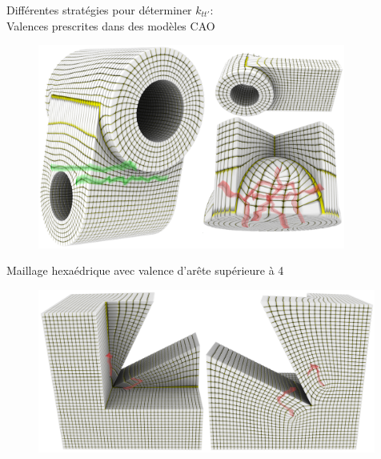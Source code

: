 \begin{frame}{Différentes stratégies pour déterminer $k_{tt'}$:\\Valences prescrites dans des modèles CAO}

    \begin{figure}
        \centering
        \includegraphics[width=0.9\textwidth]{img/hexmeshing_ff/prescribed_valences.PNG}
    \end{figure}
    
\end{frame}

\begin{frame}{Maillage hexaédrique avec valence d'arête supérieure à 4}
    \begin{figure}
        \centering
        \includegraphics[width=0.99\textwidth]{img/hexmeshing_ff/valence_5_edges.PNG}
    \end{figure}
\end{frame}
